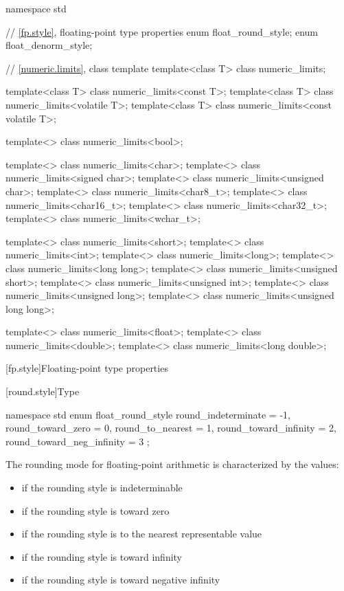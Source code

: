 \begin{codeblock}
namespace std {
  // \ref{fp.style}, floating-point type properties
  enum float_round_style;
  enum float_denorm_style;

  // \ref{numeric.limits}, class template 
  template<class T> class numeric_limits;

  template<class T> class numeric_limits<const T>;
  template<class T> class numeric_limits<volatile T>;
  template<class T> class numeric_limits<const volatile T>;

  template<> class numeric_limits<bool>;

  template<> class numeric_limits<char>;
  template<> class numeric_limits<signed char>;
  template<> class numeric_limits<unsigned char>;
  template<> class numeric_limits<char8_t>;
  template<> class numeric_limits<char16_t>;
  template<> class numeric_limits<char32_t>;
  template<> class numeric_limits<wchar_t>;

  template<> class numeric_limits<short>;
  template<> class numeric_limits<int>;
  template<> class numeric_limits<long>;
  template<> class numeric_limits<long long>;
  template<> class numeric_limits<unsigned short>;
  template<> class numeric_limits<unsigned int>;
  template<> class numeric_limits<unsigned long>;
  template<> class numeric_limits<unsigned long long>;

  template<> class numeric_limits<float>;
  template<> class numeric_limits<double>;
  template<> class numeric_limits<long double>;
}
\end{codeblock}

[fp.style]{Floating-point type properties}

[round.style]{Type }

%
\begin{codeblock}
namespace std {
  enum float_round_style {
    round_indeterminate       = -1,
    round_toward_zero         =  0,
    round_to_nearest          =  1,
    round_toward_infinity     =  2,
    round_toward_neg_infinity =  3
  };
}
\end{codeblock}

\pnum
The rounding mode for floating-point arithmetic is characterized by the
values:
\begin{itemize}
\item
{}%
if the rounding style is indeterminable
\item
{}%
if the rounding style is toward zero
\item
{}%
if the rounding style is to the nearest representable value
\item
{}%
if the rounding style is toward infinity
\item
{}%
if the rounding style is toward negative infinity
\end{itemize}


